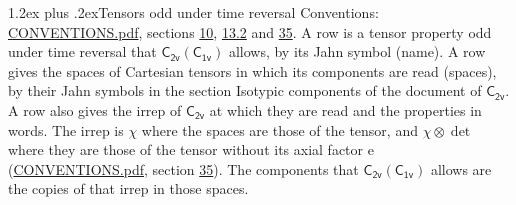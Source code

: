 \documentclass[10pt,a4paper]{article}
\makeatletter
\renewcommand\section{\@startsection{section}{1}{\z@}{-3ex plus -1ex minus -.2ex}%
  {1.2ex plus .2ex}{\normalfont\large\sffamily\bfseries\color{parttitle}}}
\numberwithin{equation}{section}
\newcommand{\grp}[1]{\mathsf{#1}}
\newcommand{\irrprod}{\otimes}
\makeatother
\begin{document}
\section{Tensors odd under time reversal}\label{s:time_odd}
Conventions: \href{../../CONVENTIONS.pdf}{CONVENTIONS.pdf}, sections \href{../../../rotation/CONVENTIONS.pdf\#conv.10}{10}, \href{../../../rotation/CONVENTIONS.pdf\#conv.13.2}{13.2} and \href{../../CONVENTIONS.pdf\#conv.35}{35}.
\leavevmode\label{n:head.name.property}A row is a tensor property odd under time reversal that $\grp{C_{2v}}(\grp{C_{1v}})$ allows, by its Jahn symbol (name). \label{n:head.spaces}A row gives the spaces of Cartesian tensors in which its components are read (spaces), by their Jahn symbols in the section Isotypic components of the document of \href{../../../rotation/data/pdf/C2v.pdf}{$\grp{C_{2v}}$}. \label{n:head.properties}A row also gives the irrep of $\grp{C_{2v}}$ at which they are read and the properties in words. The irrep is $\chi$ where the spaces are those of the tensor, and $\chi \irrprod \det$ where they are those of the tensor without its axial factor e (\href{../../CONVENTIONS.pdf}{CONVENTIONS.pdf}, section \href{../../CONVENTIONS.pdf\#conv.35}{35}). The components that $\grp{C_{2v}}(\grp{C_{1v}})$ allows are the copies of that irrep in those spaces.
\end{document}
